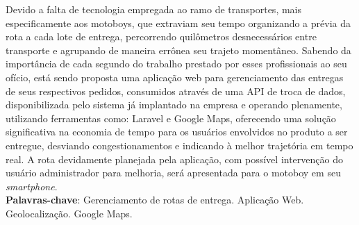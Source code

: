 
\begin{resumo}[RESUMO]
\begin{SingleSpacing}


Devido a falta de tecnologia empregada ao ramo de transportes, mais especificamente aos motoboys, que extraviam seu tempo organizando a prévia da rota a cada lote de entrega, percorrendo quilômetros desnecessários entre transporte e agrupando de maneira errônea seu trajeto momentâneo. Sabendo da importância de cada segundo do trabalho prestado por esses profissionais ao seu ofício, está sendo proposta uma aplicação web para gerenciamento das entregas de seus respectivos pedidos, consumidos através de uma API de troca de dados, disponibilizada pelo sistema já implantado na empresa e operando plenamente, utilizando ferramentas como: Laravel e Google Maps, oferecendo uma solução significativa na economia de tempo para os usuários envolvidos no produto a ser entregue, desviando congestionamentos e indicando à melhor trajetória em tempo real. A rota devidamente planejada pela aplicação, com possível intervenção do usuário administrador para melhoria, será apresentada para o motoboy em seu \textit{smartphone}. \\

\textbf{Palavras-chave}: Gerenciamento de rotas de entrega. Aplicação Web. Geolocalização. Google Maps.

\end{SingleSpacing}
\end{resumo}